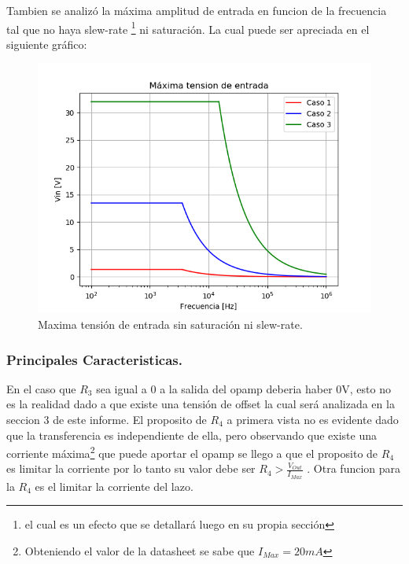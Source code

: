 Tambien se analizó la máxima amplitud de entrada en funcion de la frecuencia tal que no haya slew-rate \footnote{el cual es un efecto que se detallará luego en su propia sección} ni saturación.
La cual puede ser apreciada en el siguiente gráfico:
\begin{figure}[H]	
	\centering
	\includegraphics[width=\textwidth]{Ejercicio1/Imagenes/maxvinsr.png}
	\caption{Maxima tensión de entrada sin saturación ni slew-rate.}
	\label{fig:MaxVinsr}
\end{figure} 
\subsubsection{Principales Caracteristicas.}
En el caso que $R_3$ sea igual a 0 a la salida del opamp deberia haber 0V, esto no es la realidad dado a que existe una tensión de offset la cual será analizada en la seccion 3 de este informe.
El proposito de $R_4$ a primera vista no es evidente dado que la transferencia es independiente de ella, pero observando que existe una corriente máxima\footnote{Obteniendo el valor de la datasheet se sabe que $I_{Max}=20mA$} que puede aportar el opamp se llego a  que el proposito de $R_4$ es limitar la corriente por lo tanto su valor debe ser $R_4>\frac{V_{Out}}{I_{Max}}$ .
Otra funcion para la $R_4$ es el limitar la corriente del lazo.
